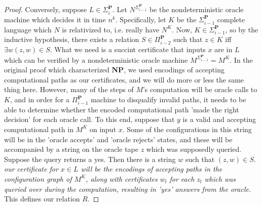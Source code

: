 \begin{proof}
    \par Conversely, suppose $L \in \Sigma_i^{\textbf{P}}$. Let $N^{\Sigma_{i-1}^{\textbf{P}}}$ be the nondeterministic oracle machine which decides it in time $n^k$. Specifically, let $K$ be the $\Sigma_{i-1}^{\textbf{P}}$ complete language which $N$ is relativized to, i.e. really have $N^K$. Now, $K \in \Sigma_{i-1}^{\textbf{P}}$, so by the inductive hypothesis, there exists a relation $S \in \Pi_{i-2}^{\textbf{P}}$ such that $z \in K$ iff $\exists w (z,w) \in S$. What we need is a succint certificate that inputs $x$ are in $L$ which can be verified by a nondeterministic oracle machine $M^{\Sigma_{i-1}^{\textbf{P}}} = M^K$. In the original proof which characterized \textbf{NP}, we used encodings of accepting computational paths as our certificates, and we will do more or less the same thing here. However, many of the steps of $M$'s computation will be oracle calls to $K$, and in order for a $\Pi_{i-1}^{\textbf{P}}$ machine to disqualify invalid paths, it needs to be able to determine whether the encoded computational path 'made the right decision' for each oracle call. To this end, suppose that $y$ is a valid and accepting computational path in $M^K$ on input $x$. Some of the configurations in this string will be in the 'oracle accepts' and 'oracle rejects' states, and these will be accompanied by a string on the oracle tape $z$ which was supposedly queried. Suppose the query returns a yes. Then there is a string $w$ such that $(z,w) \in S$. \textit{our certificate for $x \in L$ will be the encodings of accepting paths in the configuration graph of $M^K$, along with certificates $w_l$ for each $z_l$ which was queried over during the computation, resulting in 'yes' answers from the oracle.} This defines our relation $R$.

\end{proof}
